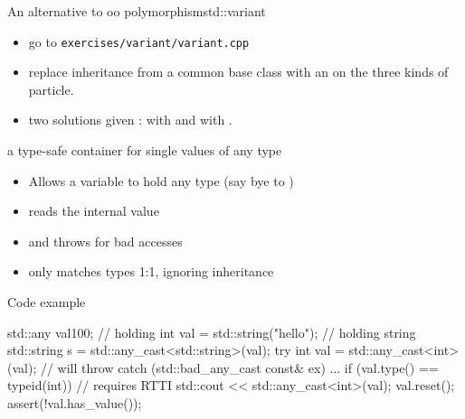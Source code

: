 \begin{frame}[fragile]
  \begin{exerciseWithShortcut}{An alternative to oo polymorphism}{std::variant}
    \begin{itemize}
      \item go to \texttt{exercises/variant/variant.cpp}
      \item replace inheritance from a common base class with an  on the three kinds of particle.
      \item two solutions given : with  and with .
    \end{itemize}
  \end{exerciseWithShortcut}
\end{frame}

\begin{frame}[fragile]
  \begin{block}{a type-safe container for single values of any type}
    \begin{itemize}
    \item Allows a variable to hold any type (say bye to )
    \item {} reads the internal value
    \item and throws  for bad accesses
    \item {} only matches types 1:1, ignoring inheritance
    \end{itemize}
  \end{block}
  \begin{exampleblock}{Code example}
    \small
    \begin{cppcode*}{}
      std::any val{100};          // holding int
      val = std::string("hello"); // holding string
      std::string s = std::any_cast<std::string>(val);
      try {
        int val = std::any_cast<int>(val); // will throw
      } catch (std::bad_any_cast const& ex) {...}
      if (val.type() == typeid(int)) // requires RTTI
        std::cout << std::any_cast<int>(val);
      val.reset(); assert(!val.has_value());
    \end{cppcode*}
  \end{exampleblock}
\end{frame}


